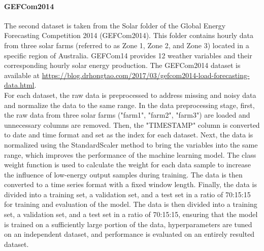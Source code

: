 \documentclass[sn-mathphys-num]{sn-jnl}%
\begin{document}
\paragraph{GEFCom2014} The second dataset is taken from the Solar folder of the Global Energy Forecasting Competition 2014 (GEFCom2014). This folder contains hourly data from three solar farms (referred to as Zone 1, Zone 2, and Zone 3) located in a specific region of Australia. GEFCom14 provides 12 weather variables and their corresponding hourly solar energy production. The GEFCom2014 dataset is available at \href{https://blog.drhongtao.com/2017/03/gefcom2014-load-forecasting-data.html}{https://blog.drhongtao.com/2017/03/gefcom2014-load-forecasting-data.html}.\\
For each dataset, the raw data is preprocessed to address missing and noisy data and normalize the data to the same range. In the data preprocessing stage, first, the raw data from three solar farms ("farm1", "farm2", "farm3") are loaded and unnecessary columns are removed. Then, the "TIMESTAMP" column is converted to date and time format and set as the index for each dataset.
Next, the data is normalized using the StandardScaler method to bring the variables into the same range, which improves the performance of the machine learning model. The class weight function is used to calculate the weight for each data sample to increase the influence of low-energy output samples during training.
The data is then converted to a time series format with a fixed window length. Finally, the data is divided into a training set, a validation set, and a test set in a ratio of 70:15:15 for training and evaluation of the model. The data is then divided into a training set, a validation set, and a test set in a ratio of 70:15:15, ensuring that the model is trained on a sufficiently large portion of the data, hyperparameters are tuned on an independent dataset, and performance is evaluated on an entirely resulted dataset.
\end{document}
